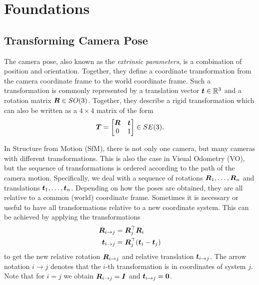 \chapter{Foundations}


	
	\section{Transforming Camera Pose}
		The camera pose, also known as the \emph{extrinsic parameters}, is a combination of position and orientation.
		Together, they define a coordinate transformation from the camera coordinate frame to the world coordinate frame.
		Such a transformation is commonly represented by a translation vector $\bm{t} \in \mathbb{R}^3$ and a rotation matrix $\bm{R} \in SO(3)$. 
		Together, they describe a rigid transformation which can also be written as a $4 \times 4$ matrix of the form
		\begin{equation}\label{eq:pose_representation_se3}
			\bm{T} = 
			\begin{bmatrix}
				\bm{R} 	& \bm{t} \\
				0 			& 1
			\end{bmatrix} 
			\in SE(3).
		\end{equation}
		
		In Structure from Motion (SfM), there is not only one camera, but many cameras with different transformations.
		This is also the case in Visual Odometry (VO), but the sequence of transformations is ordered according to the path of the camera motion. 
		Specifically, we deal with a sequence of rotations $\bm{R}_1, \dots, \bm{R}_n$ and translations $\bm{t}_1, \dots, \bm{t}_n$. 
		Depending on how the poses are obtained, they are all relative to a common (world) coordinate frame.
		Sometimes it is necessary or useful to have all transformations relative to a new coordinate system.
		This can be achieved by applying the transformations
		\begin{align}\label{eq:relative_rotation_conversion_general}
			\begin{split}
				\bm{R}_{i \rightarrow j} 		&= \bm{R}_{j}^{\top} \bm{R}_{i} \\
				\bm{t}_{i \rightarrow j} 	&= \bm{R}_{j}^{\top} (\bm{t}_i - \bm{t}_j)
			\end{split}
		\end{align}
		to get the new relative rotation 
		$\bm{R}_{i \rightarrow j}$ and relative translation $\bm{t}_{i \rightarrow j}$.
		The arrow notation $i \rightarrow j$ denotes that the $i$-th transformation is in coordinates of system $j$.
		Note that for $i = j$ we obtain 
		$\bm{R}_{i \rightarrow j} = \bm{I}$ 
		and 
		$\bm{t}_{i \rightarrow j} = \bm{0}$.
		
